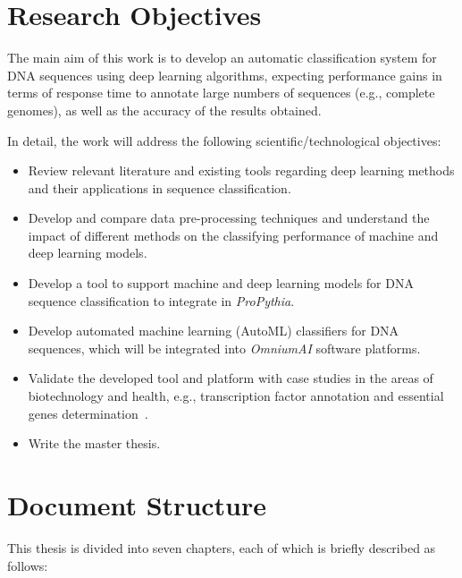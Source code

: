 \section{Research Objectives} \label{sec:research_objectives}

The main aim of this work is to develop an automatic classification system for DNA sequences using deep learning algorithms, expecting performance gains in terms of response time to annotate large numbers of sequences (e.g., complete genomes), as well as the accuracy of the results obtained. 

In detail, the work will address the following scientific/technological objectives:

\begin{itemize}
    \item Review relevant literature and existing tools regarding deep learning methods and their applications in sequence classification.
    \item Develop and compare data pre-processing techniques and understand the impact of different methods on the classifying performance of machine and deep learning models.
    \item Develop a tool to support machine and deep learning models for DNA sequence classification to integrate in \textit{ProPythia}.
    \item Develop automated machine learning (AutoML) classifiers for DNA sequences, which will be integrated into \textit{OmniumAI} software platforms.
    \item Validate the developed tool and platform with case studies in the areas of biotechnology and health, e.g., transcription factor annotation and essential genes determination~\cite{Zhang2020DeepHE:Learning,Quang2016DanQ:Sequences,Novakovsky2021BiologicallyPrediction}.
    \item Write the master thesis.
\end{itemize} 


\section{Document Structure} \label{sec:document_structure}

This thesis is divided into seven chapters, each of which is briefly described as follows:

